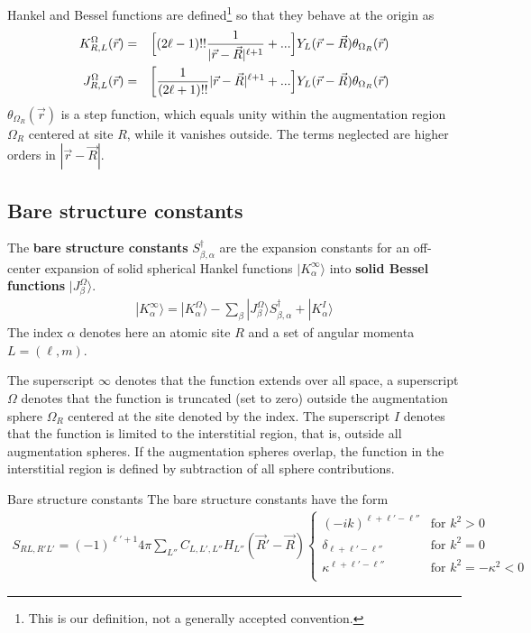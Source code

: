 \documentclass[11pt,a4paper]{report}
\begin{document}
Hankel and Bessel functions are defined\footnote{This is our
  definition, not a generally accepted convention.} so that they
behave at the origin as
\begin{eqnarray}
K^\Omega_{R,L}(\vec{r})&=&
\Bigl[(2\ell-1)!! \frac{1}{|\vec{r}-\vec{R}|^{\ell+1}} 
+...\Bigr]
Y_L(\vec{r}-\vec{R})\theta_{\Omega_R}(\vec{r})
\\
J^\Omega_{R,L}(\vec{r})&=&
\biggl[\frac{1}{(2\ell+1)!!} |\vec{r}-\vec{R}|^{\ell+1} 
+...\Bigr]Y_L(\vec{r}-\vec{R})\theta_{\Omega_R}(\vec{r})
\end{eqnarray}
$\theta_{\Omega_R}(\vec{r})$ is a step function, which equals unity within the
augmentation region $\Omega_R$ centered at site $R$, while it vanishes
outside. The terms neglected are higher orders in $|\vec{r}-\vec{R}|$.

\subsection{Bare structure constants}
The \textbf{bare structure constants}
$S^\dagger_{\beta,\alpha}$ are the expansion constants for an
off-center expansion of solid spherical Hankel functions $|K_{\alpha}^\infty\rangle$ into \textbf{solid Bessel
  functions} $|J^\Omega_{\beta}\rangle$.
\begin{eqnarray}
|K_{\alpha}^\infty\rangle=|K^\Omega_{\alpha}\rangle
-\sum_{\beta}|J^\Omega_{\beta}\rangle S^\dagger_{\beta,\alpha}
+|K^I_{\alpha}\rangle
\end{eqnarray}
The index $\alpha$ denotes here an atomic site $R$ and a set of
angular momenta $L=(\ell,m)$.

The superscript $\infty$ denotes that the function extends over all
space, a superscript $\Omega$ denotes that the function is truncated
(set to zero) outside the augmentation sphere $\Omega_{R}$ centered at
the site denoted by the index. The superscript $I$ denotes that the
function is limited to the interstitial region, that is, outside all
augmentation spheres. If the augmentation spheres overlap, the
function in the interstitial region is defined by subtraction of all
sphere contributions.



\begin{myshadowminipage}{Bare structure constants}
The bare structure constants have the form
\begin{eqnarray}
S_{RL,R'L'}=(-1)^{\ell'+1} 4\pi \sum_{L''} C_{L,L',L''} 
H_{L''}(\vec{R}'-\vec{R})
\begin{cases}
(-ik)^{\ell+\ell'-\ell''}&\text{for $k^2>0$}\\
\delta_{\ell+\ell'-\ell''}&\text{for $k^2=0$}\\
\kappa^{\ell+\ell'-\ell''}&\text{for $k^2=-\kappa^2<0$}\\
\end{cases}
\label{eq:fortmulaforbarestructureconstants}
\end{eqnarray}
\end{myshadowminipage}
\end{document}
